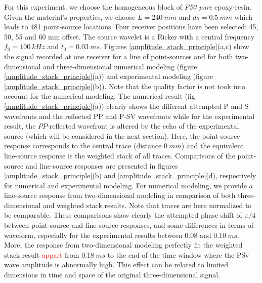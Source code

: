 \documentclass[manuscript,revised]{geophysics}
\newcommand{\twod}{two-dimensional }
\newcommand{\thrd}{three-dimensional }
\begin{document}
\noindent For this experiment, we choose the homogeneous block of \textit{F50 pure} epoxy-resin. Given the material's properties, we choose $L=240\ mm$ and $ds=0.5\ mm$ which leads to 481 point-source locations. Four receiver positions have been selected: 45, 50, 55 and 60 mm offset. The source wavelet is a Ricker with a central frequency $f_{0}=100\ kHz$ and $t_{0}=0.03\ ms$. Figures \ref{amplitude_stack_principle}(a,c) show the signal recorded at one receiver for a line of point-sources and for both \twod and \thrd numerical modeling (figure \ref{amplitude_stack_principle}(a)) and experimental modeling (figure \ref{amplitude_stack_principle}(b)). Note that the quality factor is not took into account for the numerical modeling. The numerical result (fig \ref{amplitude_stack_principle}(a)) clearly shows the different attempted P and S wavefronts and the reflected PP and P-SV wavefronts while for the experimental result, the $PP$-reflected wavefront is altered by the echo of the experimental source (which will be considered in the next section). Here, the point-source response corresponds to the central trace (distance $0\ mm$) and the equivalent line-source response is the weighted stack of all traces. Comparisons of the point-source and line-source responses are presented in figures \ref{amplitude_stack_principle}(b) and \ref{amplitude_stack_principle}(d), respectively for numerical and experimental modeling. For numerical modeling, we provide a line-source response from \twod modeling in comparison of both \thrd and weighted stack results. Note that traces are here normalized to be comparable. These comparisons show clearly the attempted phase shift of $\pi/4$ between point-source and line-source responses, and some differences in terms of waveform, especially for the experimental results between $0.08$ and $0.10\ ms$. More, the response from \twod modeling perfectly fit the weighted stack result \textcolor{red}{appart} from $0.18\ ms$ to the end of the time window where the PSv wave amplitude is abnormally high. This effect can be related to limited dimensions in time and space of the original \thrd signal.
\end{document}
